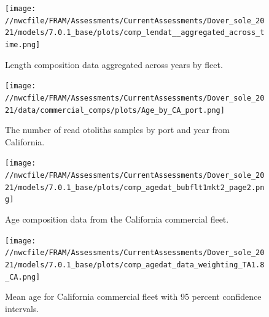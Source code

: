 \documentclass[11pt,
  english,
  a4paper,
]{article}
\begin{document}
\tagmcend\tagstructend


\begin{figure}
\centering
\texttt{[image: //nwcfile/FRAM/Assessments/CurrentAssessments/Dover\_sole\_2021/models/7.0.1\_base/plots/comp\_lendat\_\_aggregated\_across\_time.png]}
\caption{Length composition data aggregated across years by fleet.\label{fig:agg-len-data}}
\end{figure}

\tagmcend\tagstructend


\begin{figure}
\centering
\texttt{[image: //nwcfile/FRAM/Assessments/CurrentAssessments/Dover\_sole\_2021/data/commercial\_comps/plots/Age\_by\_CA\_port.png]}
\caption{The number of read otoliths samples by port and year from California.\label{fig:ca-age-port}}
\end{figure}

\tagmcend\tagstructend


\begin{figure}
\centering
\texttt{[image: //nwcfile/FRAM/Assessments/CurrentAssessments/Dover\_sole\_2021/models/7.0.1\_base/plots/comp\_agedat\_bubflt1mkt2\_page2.png]}
\caption{Age composition data from the California commercial fleet.\label{fig:ca-age-data}}
\end{figure}

\tagmcend\tagstructend


\begin{figure}
\centering
\texttt{[image: //nwcfile/FRAM/Assessments/CurrentAssessments/Dover\_sole\_2021/models/7.0.1\_base/plots/comp\_agedat\_data\_weighting\_TA1.8\_CA.png]}
\caption{Mean age for California commercial fleet with 95 percent confidence intervals.\label{fig:mean-ca-age-data}}
\end{figure}

\tagmcend\tagstructend
\end{document}
